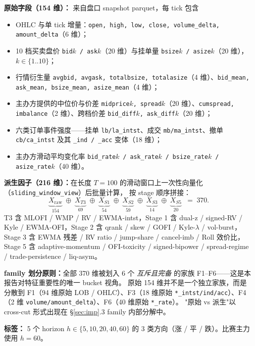 \documentclass[10.5pt,a4paper]{article}
\begin{document}
\textbf{原始字段（154 维）：} 来自盘口 snapshot parquet，每 tick 包含
\begin{itemize}[leftmargin=2.2em,itemsep=2pt,topsep=2pt]
  \item OHLC 与单 tick 增量：\texttt{open, high, low, close, volume\_delta, amount\_delta}（6 维）；
  \item 10 档买卖盘价 \texttt{bid$k$ / ask$k$}（20 维）与挂单量 \texttt{bsize$k$ / asize$k$}（20 维），$k\in\{1..10\}$；
  \item 行情衍生量 \texttt{avgbid, avgask, totalbsize, totalasize}（4 维）、\texttt{bid\_mean, ask\_mean, bsize\_mean, asize\_mean}（4 维）；
  \item 主办方提供的中位价与价差 \texttt{midprice$k$, spread$k$}（20 维）、\texttt{cumspread, imbalance}（2 维）、跨档价差 \texttt{bid\_diff$k$, ask\_diff$k$}（20 维）；
  \item 六类订单事件强度——挂单 \texttt{lb/la\_intst}、成交 \texttt{mb/ma\_intst}、撤单 \texttt{cb/ca\_intst} 及其 \texttt{\_ind / \_acc} 变体（18 维）；
  \item 主办方滑动平均变化率 \texttt{bid\_rate$k$ / ask\_rate$k$ / bsize\_rate$k$ / asize\_rate$k$}（40 维）。
\end{itemize}

\textbf{派生因子（216 维）：}在长度 $T=100$ 的滑动窗口上一次性向量化（\texttt{sliding\_window\_view}）后批量计算，
按 stage 顺序拼接：
\[
\underbrace{X_{\text{raw}}}_{154}
\;\oplus\;
\underbrace{X_{T3}}_{69}
\;\oplus\;
\underbrace{X_{S1}}_{54}
\;\oplus\;
\underbrace{X_{S2}}_{59}
\;\oplus\;
\underbrace{X_{S3}}_{14}
\;\oplus\;
\underbrace{X_{S5}}_{20}
\;\;=\; 370 .
\]
T3 含 MLOFI / WMP / RV / EWMA-intst，Stage 1 含 dual-z / signed-RV / Kyle / EWMA-OFI，Stage 2 含 qrank / skew / GOFI / Kyle-$\lambda$ / vol-burst，Stage 3 含 EWMA 残差 / RV ratio / jump-share / cancel-imb / Roll 效价比，Stage 5 含 adaptive-momentum / OFI-toxicity / signed-bipower / spread-regime / trade-persistence / liq-asym。

\textbf{family 划分原则：}全部 370 维被划入 6 个 \emph{互斥且完备} 的家族 F1--F6——这是本报告对特征重要性的唯一 bucket 视角。
原始 154 维并不是一个独立家族，而是分散到 F1（94 维原始 LOB / OHLC）、F3（18 维原始 \texttt{*\_intst/ind/acc}）、F4（2 维 \texttt{volume/amount\_delta}）、F6（40 维原始 \texttt{*\_rate}）。
"原始 vs 派生"以 cross-cut 形式出现在 §\ref{sec:imp}.3 family 内部分解中。

\textbf{标签：} 5 个 horizon $h\in\{5,10,20,40,60\}$ 的 3 类方向（涨 / 平 / 跌）。比赛主力使用 $h=60$。
\end{document}
